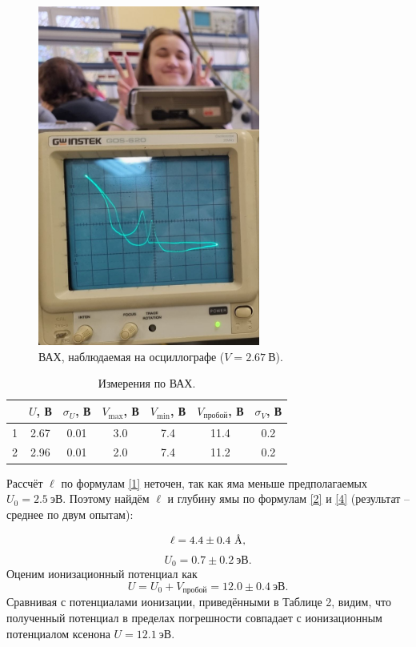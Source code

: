 \documentclass[a4paper,12pt]{article}
\newcommand{\angstrom}{\text{\normalfont\AA}}
\begin{document}
\begin{figure}[h]
\includegraphics[width=0.65\textwidth]{4.jpg}
\centering
\caption{ВАХ, наблюдаемая на осциллографе ($V = 2.67~\text{В}$).}
\end{figure}
\begin{table}[h]
\begin{tabular}{|c|c|c|c|c|c|c|}
\hline
  & $U$, В & $\sigma_U$, В & $V_{\text{max}}$, В & $V_{\text{min}}$, В & $V_{\text{пробой}}$, В & $\sigma_V$, В \\ \hline
1 & 2.67   & 0.01          & 3.0                   & 7.4                 & 11.4                   & 0.2           \\ \hline
2 & 2.96   & 0.01          & 2.0                   & 7.4                 & 11.2                   & 0.2           \\ \hline
\end{tabular}
\centering
\caption{Измерения по ВАХ.}
\end{table}
Рассчёт $\ell$ по формулам \eqref{1} неточен, так как яма меньше предполагаемых $U_0 = 2.5~\text{эВ}$. Поэтому найдём $\ell$ и глубину ямы по формулам \eqref{2} и \eqref{4} (результат -- среднее по двум опытам):

\[\ell = 4.4 \pm 0.4~\angstrom,\]
\[U_0 = 0.7 \pm 0.2~\text{эВ}.\]
Оценим ионизационный потенциал как 
\[U = U_0 + V_{\text{пробой}} = 12.0 \pm 0.4~\text{эВ}.\]
Сравнивая с потенциалами ионизации, приведёнными в Таблице 2, видим, что полученный потенциал в пределах погрешности совпадает с ионизационным потенциалом ксенона $U = 12.1~\text{эВ}$.\\
\end{document}
